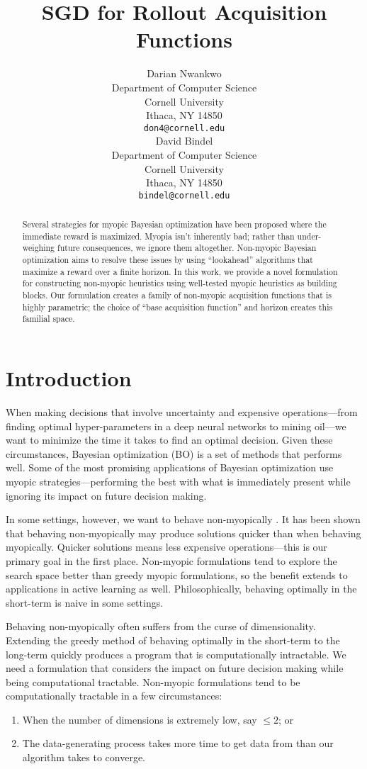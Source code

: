 \documentclass{article}
\title{SGD for Rollout Acquisition Functions}
\author{%
  Darian Nwankwo %
    \\
  Department of Computer Science\\
  Cornell University\\
  Ithaca, NY 14850 \\
  \texttt{don4@cornell.edu} \\
   \And
   David Bindel \\
   Department of Computer Science \\
   Cornell University \\
   Ithaca, NY 14850 \\
   \texttt{bindel@cornell.edu} \\
}
\begin{document}
\maketitle

\begin{abstract}
  Several strategies for myopic Bayesian optimization have been proposed where the immediate reward 
  is maximized. Myopia isn’t inherently bad; rather than under-weighing future consequences, we 
  ignore them altogether. Non-myopic Bayesian optimization aims to resolve these issues by using 
  “lookahead” algorithms that maximize a reward over a finite horizon. In this work, we provide a 
  novel formulation for constructing non-myopic heuristics using well-tested myopic heuristics as 
  building blocks.  Our formulation creates a family of non-myopic acquisition functions that is 
  highly parametric; the choice of “base acquisition function” and horizon creates this familial 
  space.
\end{abstract}

\section{Introduction}
When making decisions that involve uncertainty and expensive operations—from finding optimal 
hyper-parameters in a deep neural networks to mining oil—we want to minimize the time it takes to
find an optimal decision. Given these circumstances, Bayesian optimization (BO) is a set of methods that performs well. Some of 
the most promising applications of Bayesian optimization use myopic strategies—performing the best 
with what is immediately present while ignoring its impact on future decision making.

In some settings, however, we want to behave non-myopically \cite{Yue2019}. It has been shown 
that behaving non-myopically may produce solutions quicker than when behaving myopically. 
Quicker solutions means less expensive operations—this is our primary goal in the first place.
Non-myopic formulations tend to explore the search space better than greedy myopic formulations, 
so the benefit extends to applications in active learning as well. Philosophically, 
behaving optimally in the short-term is naive in some settings.

Behaving non-myopically often suffers from the curse of dimensionality. Extending the greedy method 
of behaving optimally in the short-term to the long-term quickly produces a program that is 
computationally intractable. We need a formulation that considers the impact on future decision 
making while being computational tractable. Non-myopic formulations tend to be computationally tractable in 
a few circumstances:
\begin{enumerate}
    \item When the number of dimensions is extremely low, say $\leq 2$; or
    \item The data-generating process takes more time to get data from than our algorithm takes to 
    converge.
\end{enumerate}
\end{document}
